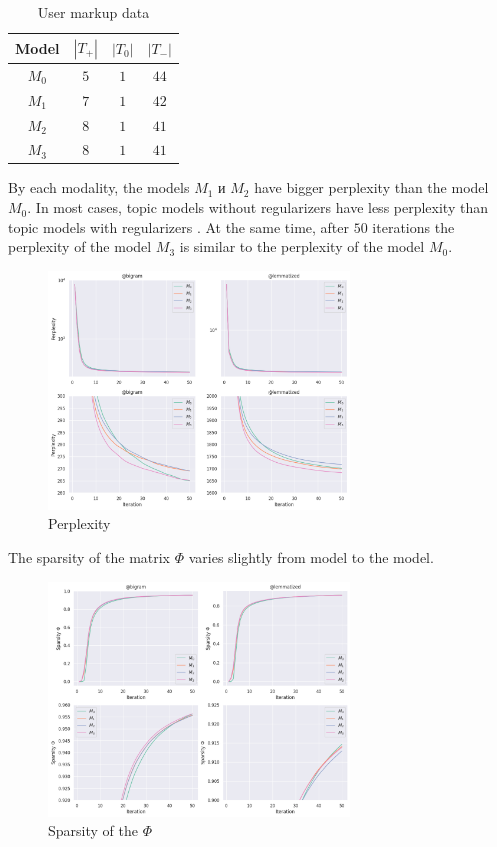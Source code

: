 \documentclass{article}
\begin{document}
\begin{table}[]
    \centering
    \begin{tabular}{c|c|c|c|}
        Model & $|T_+|$ & $|T_0|$ & $|T_-|$ \\
        \hline
        $M_0$ & $5$ & $1$ & $44$ \\
        $M_1$ & $7$ & $1$ & $42$ \\
        $M_2$ & $8$ & $1$ & $41$ \\
        $M_3$ & $8$ & $1$ & $41$
    \end{tabular}
    \caption[Table 1]{User markup data}
    \label{tab:my_label}
\end{table}

\newpage

By each modality, the models $M_1$ и $M_2$ have bigger perplexity than the model $M_0$.
In most cases, topic models without regularizers have less perplexity than topic models with regularizers  \citep{artm2}.
At the same time, after $50$ iterations the perplexity of the model $M_3$ is similar to the perplexity of the model $M_0$.

\begin{figure}[h]
\includegraphics[width=8cm]{figures/perplexity_v3.png}
\centering
\caption{Perplexity}
\end{figure}

The sparsity of the matrix $\Phi$ varies slightly from model to the model.

\begin{figure}[h]
\includegraphics[width=8cm]{figures/sparsity_v3.png}
\centering
\caption{Sparsity of the $\Phi$}
\end{figure}
\end{document}
